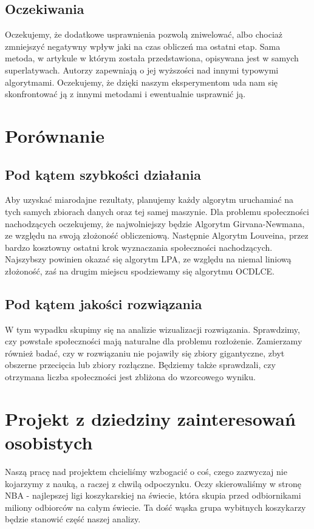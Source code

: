 \documentclass{article}
\begin{document}
\subsection{Oczekiwania}
Oczekujemy, że dodatkowe usprawnienia pozwolą zniwelować, albo chociaż zmniejszyć negatywny wpływ jaki na czas obliczeń ma ostatni etap. 
Sama metoda, w artykule w którym została przedstawiona, opisywana jest w samych superlatywach. Autorzy zapewniają o jej wyższości nad innymi typowymi algorytmami. Oczekujemy, że dzięki naszym eksperymentom uda nam się skonfrontować ją z innymi metodami i ewentualnie usprawnić ją.

\newpage
\section{Porównanie}
\subsection{Pod kątem szybkości działania}
Aby uzyskać miarodajne rezultaty, planujemy każdy algorytm uruchamiać na tych samych zbiorach danych oraz tej samej maszynie. Dla problemu społeczności nachodzących oczekujemy, że najwolniejszy będzie Algorytm Girvana-Newmana, ze względu na swoją złożoność obliczeniową. Następnie Algorytm Louveina, przez bardzo kosztowny ostatni krok wyznaczania społeczności nachodzących. Najszybszy powinien okazać się algorytm LPA, ze względu na niemal liniową złożoność, zaś na drugim miejscu spodziewamy się algorytmu OCDLCE.

\subsection{Pod kątem jakości rozwiązania}
W tym wypadku skupimy się na analizie wizualizacji rozwiązania. Sprawdzimy, czy powstałe społeczności mają naturalne dla problemu rozłożenie. Zamierzamy również badać, czy w rozwiązaniu nie pojawiły się zbiory gigantyczne, zbyt obszerne przecięcia  lub zbiory rozłączne. Będziemy także sprawdzali, czy otrzymana liczba społeczności jest zbliżona do wzorcowego wyniku.

\newpage
\section{Projekt z dziedziny zainteresowań osobistych}
Naszą pracę nad projektem chcieliśmy wzbogacić o coś, czego zazwyczaj nie kojarzymy z nauką, a raczej z chwilą odpoczynku. Oczy skierowaliśmy w stronę NBA - najlepszej ligi koszykarskiej na świecie, która skupia przed odbiornikami miliony odbiorców na całym świecie. Ta dość wąska grupa wybitnych koszykarzy będzie stanowić część naszej analizy.\\
\end{document}
